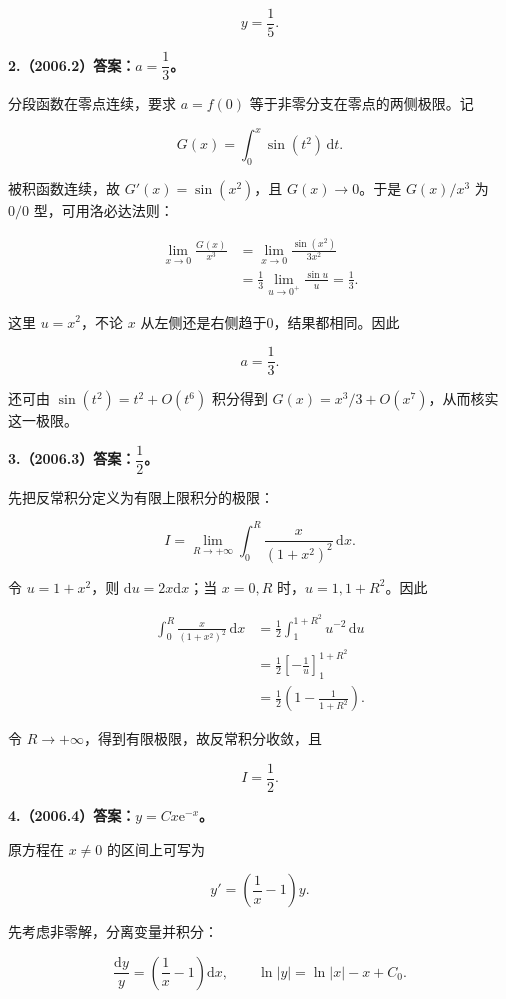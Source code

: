 \documentclass[UTF8,11pt,fontset=windows]{ctexart}
\begin{document}
$$
\boxed{y=\frac15.}
$$

\clearpage

\textbf{2.（2006.2）答案：$a=\dfrac13$。}

分段函数在零点连续，要求 $a=f(0)$ 等于非零分支在零点的两侧极限。记

$$
G(x)=\int_0^x\sin(t^2)\,\mathrm dt.
$$

被积函数连续，故 $G'(x)=\sin(x^2)$，且 $G(x)\to0$。于是 $G(x)/x^3$ 为 $0/0$ 型，可用洛必达法则：

$$
\begin{aligned}
\lim_{x\to0}\frac{G(x)}{x^3}
&=\lim_{x\to0}\frac{\sin(x^2)}{3x^2}\\
&=\frac13\lim_{u\to0^+}\frac{\sin u}{u}
=\frac13.
\end{aligned}
$$

这里 $u=x^2$，不论 $x$ 从左侧还是右侧趋于0，结果都相同。因此

$$
\boxed{a=\frac13.}
$$

还可由 $\sin(t^2)=t^2+O(t^6)$ 积分得到 $G(x)=x^3/3+O(x^7)$，从而核实这一极限。

\clearpage

\textbf{3.（2006.3）答案：$\dfrac12$。}

先把反常积分定义为有限上限积分的极限：

$$
I=\lim_{R\to+\infty}\int_0^R\frac{x}{(1+x^2)^2}\,\mathrm dx.
$$

令 $u=1+x^2$，则 $\mathrm du=2x\mathrm dx$；当 $x=0,R$ 时，$u=1,1+R^2$。因此

$$
\begin{aligned}
\int_0^R\frac{x}{(1+x^2)^2}\,\mathrm dx
&=\frac12\int_1^{1+R^2}u^{-2}\,\mathrm du\\
&=\frac12\left[-\frac1u\right]_1^{1+R^2}\\
&=\frac12\left(1-\frac1{1+R^2}\right).
\end{aligned}
$$

令 $R\to+\infty$，得到有限极限，故反常积分收敛，且

$$
\boxed{I=\frac12.}
$$

\clearpage

\textbf{4.（2006.4）答案：$y=Cx\mathrm e^{-x}$。}

原方程在 $x\ne0$ 的区间上可写为

$$
y'=\left(\frac1x-1\right)y.
$$

先考虑非零解，分离变量并积分：

$$
\frac{\mathrm dy}{y}=\left(\frac1x-1\right)\mathrm dx,
\qquad
\ln|y|=\ln|x|-x+C_0.
$$
\end{document}

